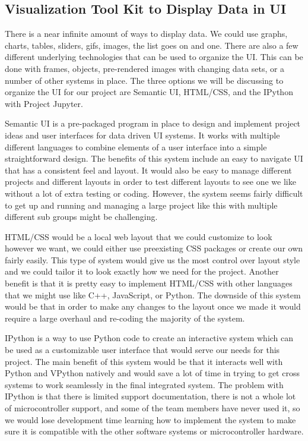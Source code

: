 \documentclass[10pt,draftclsnofoot,onecolumn]{IEEEtran}
\begin{document}
\subsection{Visualization Tool Kit to Display Data in UI}

There is a near infinite amount of ways to display data. We could use graphs, charts, tables, sliders, gifs, images, the list goes on and one. There are also a few different underlying technologies that can be used to organize the UI. This can be done with frames, objects, pre-rendered images with changing data sets, or a number of other systems in place. The three options we will be discussing to organize the UI for our project are Semantic UI, HTML/CSS, and the IPython with Project Jupyter. \par

Semantic UI is a pre-packaged program in place to design and implement project ideas and user interfaces for data driven UI systems. It works with multiple different languages to combine elements of a user interface into a simple straightforward design. The benefits of this system include an easy to navigate UI that has a consistent feel and layout. It would also be easy to manage different projects and different layouts in order to test different layouts to see one we like without a lot of extra testing or coding. However, the system seems fairly difficult to get up and running and managing a large project like this with multiple different sub groups might be challenging. \par

HTML/CSS would be a local web layout that we could customize to look however we want, we could either use preexisting CSS packages or create our own fairly easily. This type of system would give us the most control over layout style and we could tailor it to look exactly how we need for the project. Another benefit is that it is pretty easy to implement HTML/CSS with other languages that we might use like C++, JavaScript, or Python. The downside of this system would be that in order to make any changes to the layout once we made it would require a large overhaul and re-coding the majority of the system. \par

	IPython is a way to use Python code to create an interactive system which can be used as a customizable user interface that would serve our needs for this project. The main benefit of this system would be that it interacts well with Python and VPython natively and would save a lot of time in trying to get cross systems to work seamlessly in the final integrated system. The problem with IPython is that there is limited support documentation, there is not a whole lot of microcontroller support, and some of the team members have never used it, so we would lose development time learning how to implement the system to make sure it is compatible with the other software systems or microcontroller hardware.\par
	
\end{document}
